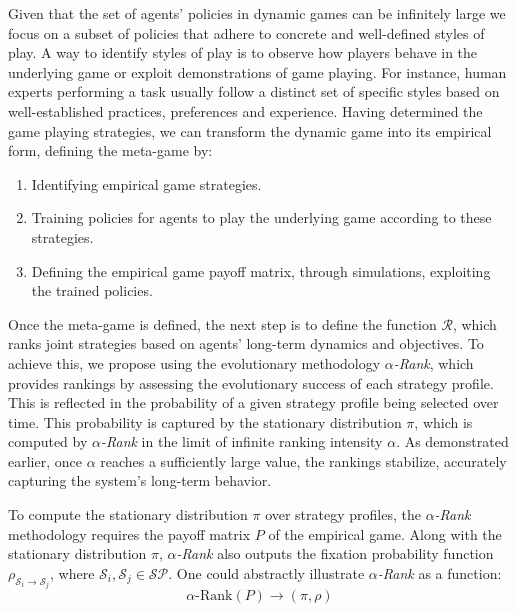         \noindent
        Given that the set of agents' policies in dynamic games can be infinitely large we focus on a subset of policies that adhere to concrete and well-defined styles of play. A way to identify styles of play is to observe how players behave in the underlying game or exploit demonstrations of game playing. For instance, human experts performing a task usually follow a distinct set of specific styles based on well-established practices, preferences and experience. Having determined the game playing strategies, we can transform the dynamic game into its empirical form, defining the meta-game by:
        \begin{enumerate}[label=(\alph*)]
            \item Identifying empirical game strategies.
            \item Training policies for agents to play the underlying game according to these strategies.
            \item Defining the empirical game payoff matrix, through simulations, exploiting the trained policies.
        \end{enumerate}

        \noindent
        Once the meta-game is defined, the next step is to define the function $\mathcal{R}$, which ranks joint strategies based on agents' long-term dynamics and objectives. To achieve this, we propose using the evolutionary methodology \emph{$\alpha$-Rank}, which provides rankings by assessing the evolutionary success of each strategy profile. This is reflected in the probability of a given strategy profile being selected over time. This probability is captured by the stationary distribution $\pi$, which is computed by \emph{$\alpha$-Rank} in the limit of infinite ranking intensity $\alpha$. As demonstrated earlier, once $\alpha$ reaches a sufficiently large value, the rankings stabilize, accurately capturing the system's long-term behavior.\tinydouble

        \noindent
        To compute the stationary distribution $\pi$ over strategy profiles, the \emph{$\alpha$-Rank} methodology requires the payoff matrix $P$ of the empirical game. Along with the stationary distribution $\pi$, \emph{$\alpha$-Rank} also outputs the fixation probability function $\rho_{\mathcal{S}_i \to \mathcal{S}_j}$, where $\mathcal{S}_i, \mathcal{S}_j \in \mathcal{SP}$. One could abstractly illustrate \emph{$\alpha$-Rank} as a function:
        \begin{equation}
            \alpha\text{-Rank}(P) \rightarrow (\pi, \rho) 
            \label{eq:abstract_arank}
        \end{equation}

